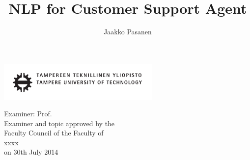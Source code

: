 \documentclass[12pt,a4paper,english
]{tutthesis}
\author{Jaakko Pasanen}
\title{NLP for Customer Support Agent} %
\begin{document}
\makeatletter

%
\thispagestyle{empty}
\vspace*{-.5cm}\noindent
\includegraphics[width=8cm]{tty_tut_logo}   %

\vspace{6.8cm}
\maketitle
\vspace{7.7cm} %

\begin{flushright}  
  \begin{minipage}[c]{6.8cm}
    \begin{spacing}{1.0}
      \textsf{Examiner: Prof. \@examiner}\\
      \textsf{Examiner and topic approved by the}\\ 
      \textsf{Faculty Council of the Faculty of}\\
      \textsf{xxxx}\\
      \textsf{on 30th July 2014}\\
    \end{spacing}
  \end{minipage}
\end{flushright}

\if@twoside
\clearpage
\fi

%
\setcounter{page}{0} %
\end{document}
